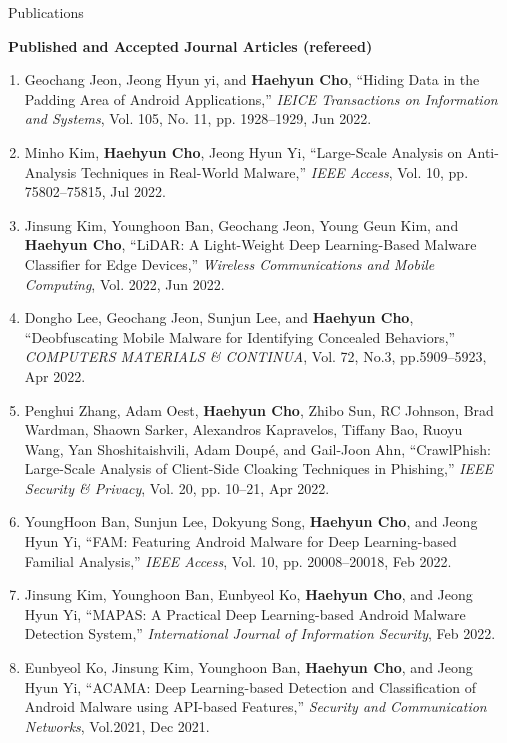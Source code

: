 \documentclass{resume} %
\begin{document}
\begin{rSection}{\faGenderless~Publications}
	\vspace{3mm}
	
    \strut\textbullet~{\bf Published and Accepted Journal Articles (refereed)}
    \begin{enumerate}[leftmargin=0pt]
		\item Geochang Jeon, Jeong Hyun yi, and \textbf{Haehyun Cho}, 
		``Hiding Data in the Padding Area of Android Applications,''
		\emph{IEICE Transactions on Information and Systems},
		Vol. 105, No. 11, pp. 1928--1929, Jun 2022.

		\item Minho Kim, \textbf{Haehyun Cho}, Jeong Hyun Yi, 
		``Large-Scale Analysis on Anti-Analysis Techniques in Real-World Malware,''
		\emph{IEEE Access}, 
		Vol. 10,  pp. 75802--75815, Jul 2022.

		\item Jinsung Kim, Younghoon Ban, Geochang Jeon, Young Geun Kim, and \textbf{Haehyun Cho}, 
		``LiDAR: A Light-Weight Deep Learning-Based Malware Classifier for Edge Devices,''
		\emph{Wireless Communications and Mobile Computing}, 
		Vol. 2022, Jun 2022.

		\item Dongho Lee, Geochang Jeon, Sunjun Lee, and \textbf{Haehyun Cho},
		``Deobfuscating Mobile Malware for Identifying Concealed Behaviors,''
		\emph{COMPUTERS MATERIALS \& CONTINUA}, 
		Vol. 72, No.3, pp.5909--5923, Apr 2022.
		
		\item Penghui Zhang, Adam Oest, \textbf{Haehyun Cho}, Zhibo Sun, RC Johnson, Brad Wardman, Shaown Sarker, Alexandros Kapravelos, Tiffany Bao, Ruoyu Wang, Yan Shoshitaishvili, Adam Doup\'e, and Gail-Joon Ahn,
		``CrawlPhish: Large-Scale Analysis of Client-Side Cloaking Techniques in Phishing,''
		\emph{IEEE Security \& Privacy}, 
		Vol. 20, pp. 10--21, Apr 2022. 

		\item YoungHoon Ban, Sunjun Lee, Dokyung Song, \textbf{Haehyun Cho}, and Jeong Hyun Yi,
		``FAM: Featuring Android Malware for Deep Learning-based Familial Analysis,'' 
		\emph{IEEE Access}, 
		Vol. 10, pp. 20008--20018, Feb 2022.
		
		\item Jinsung Kim, Younghoon Ban, Eunbyeol Ko, \textbf{Haehyun Cho}, and Jeong Hyun Yi,
		``MAPAS: A Practical Deep Learning-based Android Malware Detection System,''
		\emph{International Journal of Information Security}, 
		Feb 2022.
		
		\item Eunbyeol Ko, Jinsung Kim, Younghoon Ban, \textbf{Haehyun Cho}, and Jeong Hyun Yi, 
		``ACAMA: Deep Learning-based Detection and Classification of Android Malware using API-based Features,''
		\emph{Security and Communication Networks}, 
		Vol.2021, Dec 2021.
		

\end{enumerate}
\end{rSection}
\end{document}
